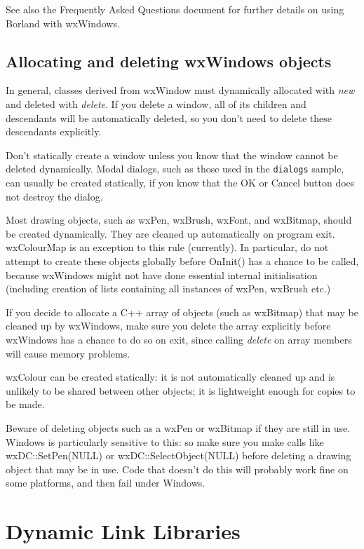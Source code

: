 See also the Frequently Asked Questions document for further details
on using Borland with wxWindows.

\subsection{Allocating and deleting wxWindows objects}

In general, classes derived from wxWindow must dynamically allocated
with {\it new} and deleted with {\it delete}. If you delete a window,
all of its children and descendants will be automatically deleted,
so you don't need to delete these descendants explicitly.

Don't statically create a window unless you know that the window
cannot be deleted dynamically. Modal dialogs, such as those used
in the {\tt dialogs} sample, can usually be created statically,
if you know that the OK or Cancel button does not destroy the dialog.

Most drawing objects, such as wxPen, wxBrush, wxFont, and wxBitmap, should be
created dynamically. They are cleaned up automatically on program exit.
wxColourMap is an exception to this rule (currently). In particular,
do not attempt to create these objects globally before OnInit() has a chance
to be called, because wxWindows might not have done essential internal initialisation
(including creation of lists containing all instances of wxPen, wxBrush etc.)

If you decide to allocate a C++ array of objects (such as wxBitmap) that may
be cleaned up by wxWindows, make sure you delete the array explicitly
before wxWindows has a chance to do so on exit, since calling {\it delete} on
array members will cause memory problems.

wxColour can be created statically: it is not automatically cleaned
up and is unlikely to be shared between other objects; it is lightweight
enough for copies to be made.

Beware of deleting objects such as a wxPen or wxBitmap if they are still in use.
Windows is particularly sensitive to this: so make sure you
make calls like wxDC::SetPen(NULL) or wxDC::SelectObject(NULL) before deleting
a drawing object that may be in use. Code that doesn't do this will probably work
fine on some platforms, and then fail under Windows.

\section{Dynamic Link Libraries}

